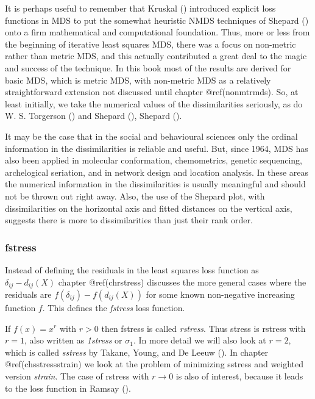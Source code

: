 \documentclass[
  12pt,
  letterpaper,
  DIV=11,
  numbers=noendperiod]{scrartcl}
\begin{document}
It is perhaps useful to remember that Kruskal
() introduced explicit loss functions
in MDS to put the somewhat heuristic NMDS techniques of Shepard
() onto a firm mathematical and
computational foundation. Thus, more or less from the beginning of
iterative least squares MDS, there was a focus on non-metric rather than
metric MDS, and this actually contributed a great deal to the magic and
success of the technique. In this book most of the results are derived
for basic MDS, which is metric MDS, with non-metric MDS as a relatively
straightforward extension not discussed until chapter @ref(nonmtrmds).
So, at least initially, we take the numerical values of the
dissimilarities seriously, as do W. S. Torgerson
() and Shepard
(), Shepard
().

It may be the case that in the social and behavioural sciences only the
ordinal information in the dissimilarities is reliable and useful. But,
since 1964, MDS has also been applied in molecular conformation,
chemometrics, genetic sequencing, archelogical seriation, and in network
design and location analysis. In these areas the numerical information
in the dissimilarities is usually meaningful and should not be thrown
out right away. Also, the use of the Shepard plot, with dissimilarities
on the horizontal axis and fitted distances on the vertical axis,
suggests there is more to dissimilarities than just their rank order.

\subsubsection{fstress}\label{genfstress}

Instead of defining the residuals in the least squares loss function as
\(\delta_{ij}-d_{ij}(X)\) chapter @ref(chrstress) discusses the more
general cases where the residuals are \(f(\delta_{ij})-f(d_{ij}(X))\)
for some known non-negative increasing function \(f\). This defines the
\emph{fstress} loss function.

If \(f(x)=x^r\) with \(r>0\) then fstress is called \emph{rstress}. Thus
stress is rstress with \(r=1\), also written as \emph{1stress} or
\(\sigma_1\). In more detail we will also look at \(r=2\), which is
called \emph{sstress} by Takane, Young, and De Leeuw
(). In chapter
@ref(chsstressstrain) we look at the problem of minimizing sstress and
weighted version \emph{strain}. The case of rstress with
\(r\rightarrow 0\) is also of interest, because it leads to the loss
function in Ramsay ().
\end{document}
